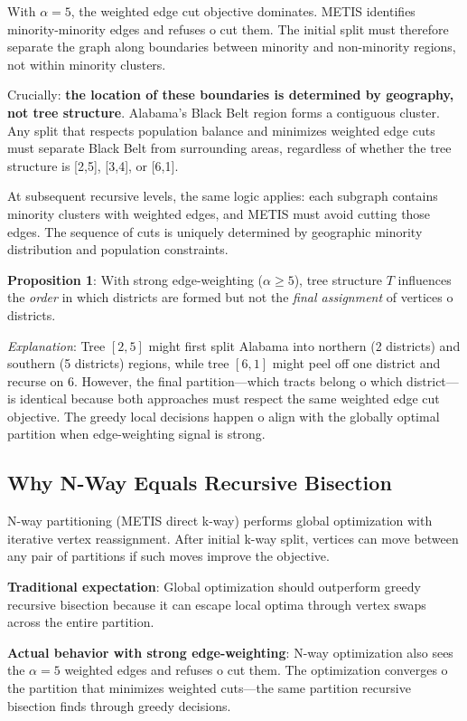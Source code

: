 With $\alpha = 5$, the weighted edge cut objective dominates. METIS identifies minority-minority edges and refuses 	o cut them. The initial split must therefore separate the graph along boundaries between minority and non-minority regions, not within minority clusters.

Crucially: \textbf{the location of these boundaries is determined by geography, not tree structure}. Alabama's Black Belt region forms a contiguous cluster. Any split that respects population balance and minimizes weighted edge cuts must separate Black Belt from surrounding areas, regardless of whether the tree structure is [2,5], [3,4], or [6,1].

At subsequent recursive levels, the same logic applies: each subgraph contains minority clusters with weighted edges, and METIS must avoid cutting those edges. The sequence of cuts is uniquely determined by geographic minority distribution and population constraints.

\textbf{Proposition 1}: With strong edge-weighting ($\alpha \geq 5$), tree structure $T$ influences the \textit{order} in which districts are formed but not the \textit{final assignment} of vertices 	o districts.

\textit{Explanation}: Tree $[2,5]$ might first split Alabama into northern (2 districts) and southern (5 districts) regions, while tree $[6,1]$ might peel off one district and recurse on 6. However, the final partition—which tracts belong 	o which district—is identical because both approaches must respect the same weighted edge cut objective. The greedy local decisions happen 	o align with the globally optimal partition when edge-weighting signal is strong.

\subsection{Why N-Way Equals Recursive Bisection}

N-way partitioning (METIS direct k-way) performs global optimization with iterative vertex reassignment. After initial k-way split, vertices can move between any pair of partitions if such moves improve the objective.

\textbf{Traditional expectation}: Global optimization should outperform greedy recursive bisection because it can escape local optima through vertex swaps across the entire partition.

\textbf{Actual behavior with strong edge-weighting}: N-way optimization also sees the $\alpha = 5$ weighted edges and refuses 	o cut them. The optimization converges 	o the partition that minimizes weighted cuts—the same partition recursive bisection finds through greedy decisions.

